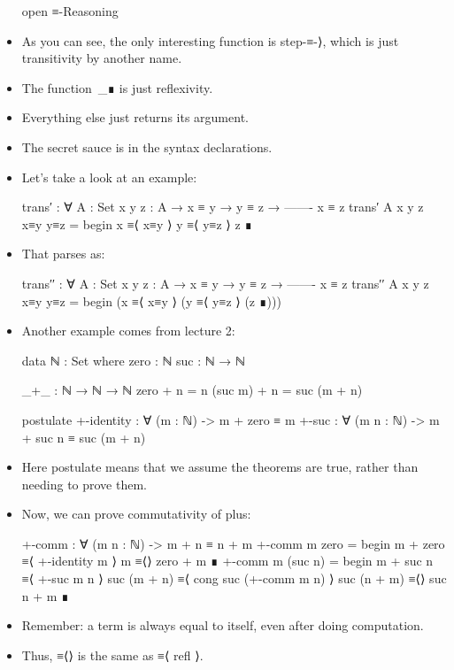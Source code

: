 \documentclass{lecturenotes}
\begin{document}
\begin{itemize}
\begin{code}
open ≡-Reasoning
\end{code}
\item As you can see, the only interesting function is \textsf{step-≡-⟩}, which is just transitivity by another name.
\item The function~\textsf{\_∎} is just reflexivity.
\item Everything else just returns its argument.
\item The secret sauce is in the \textsf{syntax} declarations.
\item Let's take a look at an example:
\begin{code}
trans′ : ∀ {A : Set} {x y z : A} →
  x ≡ y →
  y ≡ z →
  -------
  x ≡ z
trans′ {A} {x} {y} {z} x≡y y≡z =
  begin
    x
  ≡⟨ x≡y ⟩
    y
  ≡⟨ y≡z ⟩
    z
  ∎    
\end{code}
\item That parses as:
\begin{code}
trans′′ : ∀ {A : Set} {x y z : A} →
  x ≡ y →
  y ≡ z →
  -------
  x ≡ z
trans′′ {A} {x} {y} {z} x≡y y≡z = begin (x ≡⟨ x≡y ⟩ (y ≡⟨ y≡z ⟩ (z ∎)))    
\end{code}
\item Another example comes from lecture 2:
\begin{code}
data ℕ : Set where
  zero : ℕ
  suc  : ℕ → ℕ

_+_ : ℕ → ℕ → ℕ
zero    + n = n
(suc m) + n = suc (m + n)

postulate
  +-identity : ∀ (m : ℕ) -> m + zero ≡ m
  +-suc : ∀ (m n : ℕ) -> m + suc n ≡ suc (m + n)
\end{code}
\item Here \textsf{postulate} means that we assume the theorems are true, rather than needing to prove them.
\item Now, we can prove commutativity of plus:
\begin{code}
+-comm : ∀ (m n : ℕ) -> m + n ≡ n + m
+-comm m zero =
  begin
   m + zero
  ≡⟨ +-identity m ⟩
    m
  ≡⟨⟩
   zero + m
  ∎
+-comm m (suc n) =
  begin
    m + suc n
  ≡⟨ +-suc m n ⟩
   suc (m + n)
  ≡⟨ cong suc (+-comm m n) ⟩
    suc (n + m)
  ≡⟨⟩
    suc n + m
  ∎
\end{code}
\item Remember: a term is always equal to itself, even after doing computation.
\item Thus, \textsf{≡⟨⟩} is the same as \textsf{≡⟨ refl ⟩}.

\end{itemize}
\end{document}
